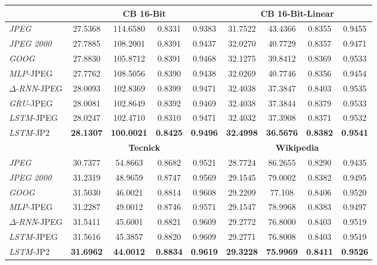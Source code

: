 \documentclass[smallabstract,smallcaptions]{dccpaper}
\begin{document}
\begin{table}[t]
{\begin{tabular}{|l||c|c|c|c||c|c|c|c|}
  \hline
    & \multicolumn{4}{c||}{\textbf{CB 16-Bit}} & \multicolumn{4}{c|}{\textbf{CB 16-Bit-Linear}}\\
  \hline
  \emph{JPEG} &27.5368 & 114.6580 & 0.8331 & 0.9383 & 31.7522 & 43.4366 & 0.8355 & 0.9455 \\
  \emph{JPEG 2000} & 27.7885 & 108.2001 & 0.8391 & 0.9437 & 32.0270 & 40.7729 & 0.8357 & 0.9471 \\
  \emph{GOOG} & 27.8830 & 105.8712 & 0.8391 & 0.9468  & 32.1275 & 39.8412 & 0.8369 & 0.9533 \\
  \emph{MLP}-JPEG & 27.7762 & 108.5056  & 0.8390 & 0.9438 & 32.0269 & 40.7746  & 0.8356 & 0.9454 \\
  $\Delta$-\emph{RNN}-JPEG & 28.0093 & 102.8369 & 0.8399 & 0.9471 & 32.4038 & 37.3847 & 0.8403 & 0.9535 \\
  \emph{GRU}-JPEG & 28.0081 & 102.8649 & 0.8392 & 0.9469 & 32.4038 & 37.3844 & 0.8379 & 0.9533 \\
  \emph{LSTM}-JPEG & 28.0247 & 102.4710 & 0.8310 & 0.9471 & 32.4032 & 37.3908 & 0.8371 & 0.9532 \\
  \emph{LSTM}-JP2 & \textbf{28.1307} & \textbf{100.0021} & \textbf{0.8425} & \textbf{0.9496} & \textbf{32.4998} & \textbf{36.5676} & \textbf{0.8382} & \textbf{0.9541} \\

  \hline
  & \multicolumn{4}{c||}{\textbf{Tecnick}} & \multicolumn{4}{c|}{\textbf{Wikipedia}}\\
  \hline
  \emph{JPEG} &  30.7377  & 54.8663 & 0.8682 &  0.9521 & 28.7724  & 86.2655  & 0.8290 &  0.9435\\
  \emph{JPEG 2000} & 31.2319 & 48.9659 & 0.8747 & 0.9569 & 29.1545 & 79.0002 & 0.8382 & 0.9495 \\
  \emph{GOOG} & 31.5030 & 46.0021 & 0.8814 & 0.9608 & 29.2209 &  77.108  &  0.8406 &  0.9520 \\
  \emph{MLP}-JPEG & 31.2287 & 49.0012 & 0.8746 &  0.9571 & 29.1547  & 78.9968 &  0.8383 &  0.9497 \\
  $\Delta$-\emph{RNN}-JPEG &  31.5411  & 45.6001  & 0.8821 &  0.9609 & 29.2772  & 76.8000  & 0.8403  & 0.9519\\
  \emph{LSTM}-JPEG & 31.5616 & 45.3857 & 0.8820 & 0.9609 & 29.2771 & 76.8008 & 0.8403 & 0.9519\\
  \emph{LSTM}-JP2 & \textbf{31.6962} & \textbf{44.0012} & \textbf{0.8834} & \textbf{0.9619} & \textbf{29.3228} & \textbf{75.9969} & \textbf{0.8411} & \textbf{0.9526} \\
  \hline
\end{tabular}
}
\end{table}
\setlength{\tabcolsep}{1.4pt}
\end{document}
